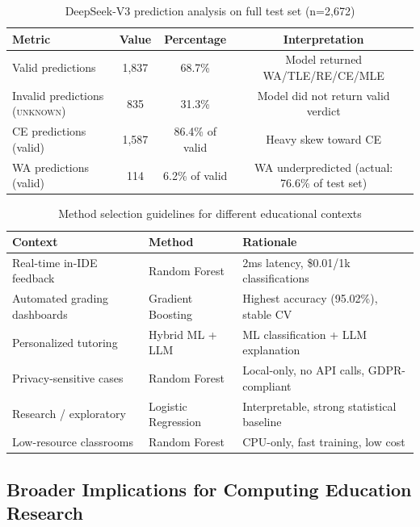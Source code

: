 \documentclass[10pt,a4paper]{article}
\begin{document}
\begin{table}[htbp]
\centering
\caption{DeepSeek-V3 prediction analysis on full test set (n=2,672)}
\label{tab:deepseek-analysis}
\begin{tabular}{@{}lccc@{}}
\toprule
\textbf{Metric} & \textbf{Value} & \textbf{Percentage} & \textbf{Interpretation} \\
\midrule
Valid predictions          & 1,837 & 68.7\% & Model returned WA/TLE/RE/CE/MLE \\
Invalid predictions (\textsc{unknown}) & 835   & 31.3\% & Model did not return valid verdict \\
\midrule
CE predictions (valid)    & 1,587 & 86.4\% of valid & Heavy skew toward CE \\
WA predictions (valid)    & 114   & 6.2\% of valid  & WA underpredicted (actual: 76.6\% of test set) \\
\bottomrule
\end{tabular}
\end{table}

\begin{table}[htbp]
\centering
\caption{Method selection guidelines for different educational contexts}
\label{tab:guidelines}
\begin{tabular}{>{\raggedright\arraybackslash}p{2.8cm}
                >{\raggedright\arraybackslash}p{2.8cm}
                >{\raggedright\arraybackslash}p{6.4cm}}
\toprule
\textbf{Context} & \textbf{Method} & \textbf{Rationale} \\
\midrule
Real-time in-IDE feedback & Random Forest & 2ms latency, \$0.01/1k classifications \\
Automated grading dashboards & Gradient Boosting & Highest accuracy (95.02\%), stable CV \\
Personalized tutoring & Hybrid ML + LLM & ML classification + LLM explanation \\
Privacy-sensitive cases & Random Forest & Local-only, no API calls, GDPR-compliant \\
Research / exploratory & Logistic Regression & Interpretable, strong statistical baseline \\
Low-resource classrooms & Random Forest & CPU-only, fast training, low cost \\
\bottomrule
\end{tabular}
\end{table}

\subsection{Broader Implications for Computing Education Research}
\end{document}
